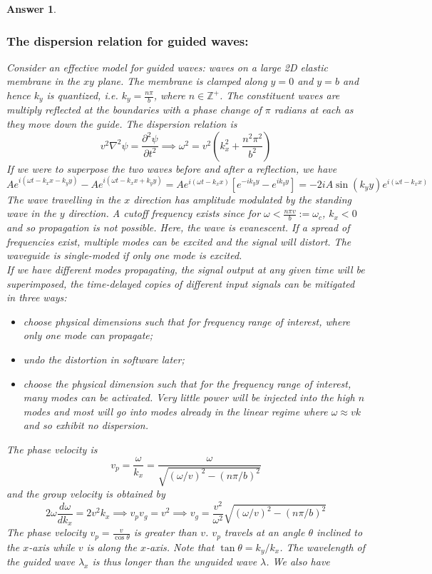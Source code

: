 \documentclass[a4paper]{article}
\newtheorem{ans}{Answer}[subsection]
\theoremstyle{new}
\begin{document}
\begin{ans}
\subsubsection*{The dispersion relation for guided waves:}
Consider an effective model for guided waves: waves on a large 2D elastic membrane in the $xy$ plane. The membrane is clamped along $y=0$ and $y=b$ and hence $k_y$ is quantized, i.e. $k_y=\frac{n\pi}{b}$, where $n\in\mathbb{Z}^+$. The constituent waves are multiply reflected at the boundaries with a phase change of $\pi$ radians at each as they move down the guide. The dispersion relation is $$v^2\nabla^2\psi=\frac{\partial^2\psi}{\partial t^2}\implies\omega^2=v^2(k_x^2+\frac{n^2\pi^2}{b^2})$$ 
If we were to superpose the two waves before and after a reflection, we have
$$Ae^{i(\omega t-k_xx-k_yy)}-Ae^{i(\omega t-k_xx+k_yy)}=Ae^{i(\omega t-k_xx)}[e^{-ik_yy}-e^{ik_yy}]=-2iA\sin(k_yy)e^{i(\omega t-k_xx)}$$
The wave travelling in the $x$ direction has amplitude modulated by the standing wave in the $y$ direction. A cutoff frequency exists since for $\omega<\frac{n\pi v}{b}:=\omega_c$, $k_x<0$ and so propagation is not possible. Here, the wave is evanescent. If a spread of frequencies exist, multiple modes can be excited and the signal will distort. The waveguide is single-moded if only one mode is excited.\\[5pt]
If we have different modes propagating, the signal output at any given time will be superimposed, the time-delayed copies of different input signals can be mitigated in three ways:
\begin{itemize}
    \item choose physical dimensions such that for frequency range of interest, where only one mode can propagate;
    \item undo the distortion in software later;
    \item choose the physical dimension such that for the frequency range of interest, many modes can be activated. Very little power will be injected into the high $n$ modes and most will go into modes already in the linear regime where $\omega\approx vk$ and so exhibit no dispersion.
\end{itemize}
The phase velocity is $$v_p=\frac{\omega}{k_x}=\frac{\omega}{\sqrt{(\omega/v)^2-(n\pi/b)^2}}$$
and the group velocity is obtained by $$2\omega\frac{d\omega}{dk_x}=2v^2k_x\implies v_pv_g=v^2\implies v_g=\frac{v^2}{\omega^2}\sqrt{(\omega/v)^2-(n\pi/b)^2}$$
The phase velocity $v_p=\frac{v}{\cos\theta}$ is greater than $v$. $v_p$ travels at an angle $\theta$ inclined to the $x$-axis while $v$ is along the $x$-axis. Note that $\tan\theta=k_y/k_x$. The wavelength of the guided wave $\lambda_x$ is thus longer than the unguided wave $\lambda$. We also have 

\end{ans}
\end{document}
